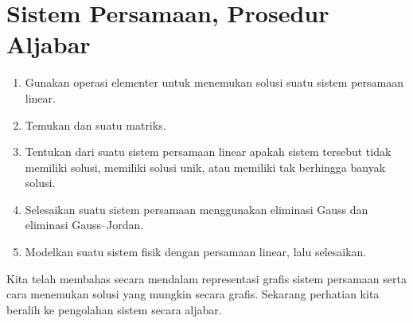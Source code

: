\section{Sistem Persamaan, Prosedur Aljabar}

\begin{outcome}
\begin{enumerate}
\item[A.] Gunakan operasi elementer untuk menemukan solusi suatu sistem persamaan linear.

\item[B.] Temukan \ef\;dan \rref\;suatu matriks.

\item[C.] Tentukan dari \ef{} suatu sistem persamaan linear apakah sistem tersebut tidak memiliki solusi, memiliki
solusi unik, atau memiliki tak berhingga banyak solusi.

\item[D.] Selesaikan suatu sistem persamaan menggunakan eliminasi Gauss dan eliminasi Gauss--Jordan.

\item[E.] Modelkan suatu sistem fisik dengan persamaan linear, lalu selesaikan.
\end{enumerate}

\end{outcome}

Kita telah membahas secara mendalam representasi grafis sistem persamaan serta cara menemukan solusi yang mungkin
secara grafis. Sekarang perhatian kita beralih ke pengolahan sistem secara aljabar.

